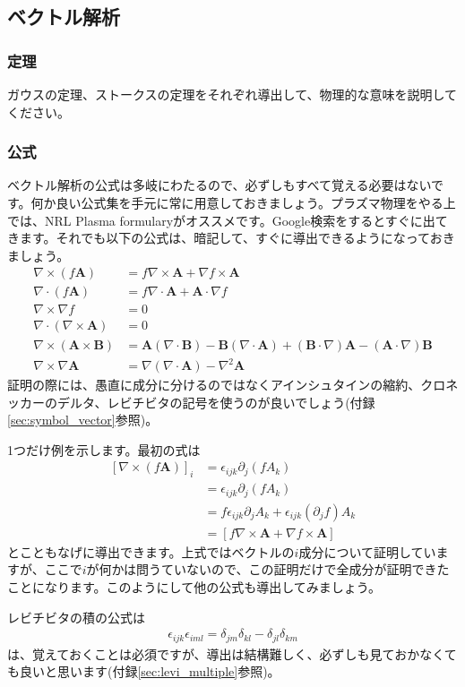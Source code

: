 \documentclass{ltjarticle}
\begin{document}
\subsection{ベクトル解析}
\subsubsection{定理}
ガウスの定理、ストークスの定理をそれぞれ導出して、物理的な意味を説明してください。
\subsubsection{公式}
ベクトル解析の公式は多岐にわたるので、必ずしもすべて覚える必要はないです。何か良い公式集を手元に常に用意しておきましょう。プラズマ物理をやる上では、NRL Plasma formularyがオススメです。Google検索をするとすぐに出てきます。それでも以下の公式は、暗記して、すぐに導出できるようになっておきましょう。
\begin{align*}
    \nabla\times(f\bm{A}) &= f\nabla\times\bm{A} + \nabla f \times \bm{A}\\
    \nabla\cdot(f\bm{A}) &= f\nabla\cdot\bm{A} + \bm{A}\cdot\nabla f\\
    \nabla\times \nabla f &= 0 \\
    \nabla \cdot \left(\nabla \times \bm{A}\right) &= 0 \\
    \nabla \times(\bm{A}\times\bm{B}) &= \bm{A}\left(\nabla\cdot\bm{B}\right) - \bm{B}\left(\nabla\cdot\bm{A}\right)
    + \left(\bm{B}\cdot\nabla\right)\bm{A} - \left(\bm{A}\cdot\nabla\right)\bm{B}\\
    \nabla\times\nabla\bm{A} &= \nabla\left(\nabla\cdot\bm{A}\right) - \nabla^2 \bm{A}
\end{align*}
証明の際には、愚直に成分に分けるのではなくアインシュタインの縮約、クロネッカーのデルタ、レビチビタの記号を使うのが良いでしょう(付録\ref{sec:symbol_vector}参照)。\par
1つだけ例を示します。最初の式は
\begin{align}
    \left[\nabla\times\left(f\bm{A}\right)\right]_i &= \epsilon_{ijk}\partial_j \left(fA_k\right) \nonumber\\
    & = \epsilon_{ijk}\partial_j \left(fA_k\right) \nonumber\\
    & = f\epsilon_{ijk} \partial_j A_k + \epsilon_{ijk}\left(\partial_j f\right) A_k \nonumber\\
    & = \left[f\nabla\times \bm{A} + \nabla f \times \bm{A}\right]
\end{align}
とこともなげに導出できます。上式ではベクトルの$i$成分について証明していますが、ここで$i$が何かは問うていないので、この証明だけで全成分が証明できたことになります。このようにして他の公式も導出してみましょう。
\par
レビチビタの積の公式は
\begin{align}
    \epsilon_{ijk}\epsilon_{iml} = \delta_{jm}\delta_{kl} - \delta_{jl}\delta_{km}
\end{align}
は、覚えておくことは必須ですが、導出は結構難しく、必ずしも見ておかなくても良いと思います(付録\ref{sec:levi_multiple}参照)。
\end{document}

